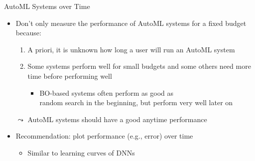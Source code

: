 \begin{frame}[c]{AutoML Systems over Time}

\begin{itemize}
	\item Don't only measure the performance of AutoML systems for a fixed budget because:
	\begin{enumerate}
	   \item A priori, it is unknown how long a user will run an AutoML system
	   \item Some systems perform well for small budgets and some others need more time before performing well
	   \begin{itemize}
	   	\item BO-based systems often perform as good as\\ random search in the beginning, but perform very well later on
	   \end{itemize}
    \end{enumerate}
	\pause
	\item[$\leadsto$] AutoML systems should have a good anytime performance
	\pause
	\medskip
	\item Recommendation: plot performance (e.g., error) over time
	\begin{itemize}
		\item Similar to learning curves of DNNs 
	\end{itemize} 
\end{itemize}


\end{frame}
